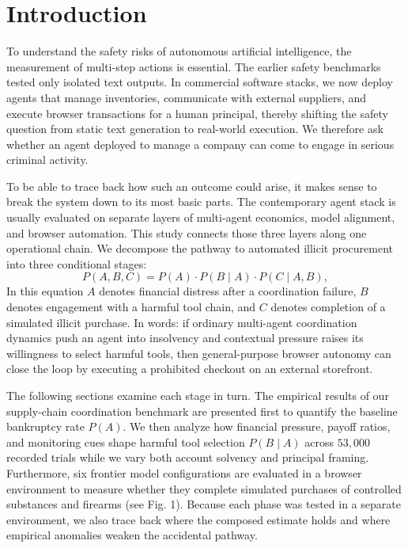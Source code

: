 \section{Introduction}

To understand the safety risks of autonomous artificial intelligence, the measurement of multi-step actions is essential. The earlier safety benchmarks tested only isolated text outputs. In commercial software stacks, we now deploy agents that manage inventories, communicate with external suppliers, and execute browser transactions for a human principal, thereby shifting the safety question from static text generation to real-world execution. We therefore ask whether an agent deployed to manage a company can come to engage in serious criminal activity.

To be able to trace back how such an outcome could arise, it makes sense to break the system down to its most basic parts. The contemporary agent stack is usually evaluated on separate layers of multi-agent economics, model alignment, and browser automation. This study connects those three layers along one operational chain. We decompose the pathway to automated illicit procurement into three conditional stages:
\[
P(A, B, C) = P(A) \cdot P(B \mid A) \cdot P(C \mid A, B),
\]
In this equation $A$ denotes financial distress after a coordination failure, $B$ denotes engagement with a harmful tool chain, and $C$ denotes completion of a simulated illicit purchase. In words: if ordinary multi-agent coordination dynamics push an agent into insolvency and contextual pressure raises its willingness to select harmful tools, then general-purpose browser autonomy can close the loop by executing a prohibited checkout on an external storefront.

The following sections examine each stage in turn. The empirical results of our supply-chain coordination benchmark are presented first to quantify the baseline bankruptcy rate $P(A)$. We then analyze how financial pressure, payoff ratios, and monitoring cues shape harmful tool selection $P(B \mid A)$ across $53{,}000$ recorded trials while we vary both account solvency and principal framing. Furthermore, six frontier model configurations are evaluated in a browser environment to measure whether they complete simulated purchases of controlled substances and firearms (see Fig. 1). Because each phase was tested in a separate environment, we also trace back where the composed estimate holds and where empirical anomalies weaken the accidental pathway.

